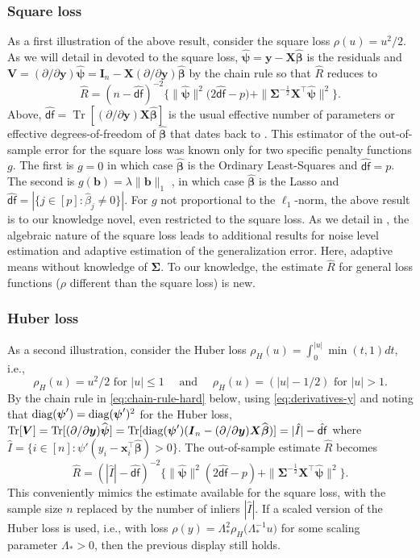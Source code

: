 \documentclass[11pt]{amsart}
\numberwithin{equation}{section}
\numberwithin{equation}{section}
\def\diag{\hbox{\rm diag}}
\DeclareMathOperator{\trace}{Tr}
\def\mathbold{\boldsymbol} %
\def\bb{\mathbold{b}}\def\bhat{\widehat{b}}\def\btil{\widetilde{b}}
\def\bI{\mathbold{I}}\def\hbI{{\widehat{\bI}}}\def\tbI{{\widetilde{\bI}}}
\def\bV{\mathbold{V}}\def\hbV{{\widehat{\bV}}}\def\tbV{{\widetilde{\bV}}}
\def\bx{\mathbold{x}}\def\xhat{\widehat{x}}\def\xtil{\widetilde{x}}\def\xbar{{\overline x}}\def\vbx{{\bf x}}
\def\bX{\mathbold{X}}\def\hbX{{\widehat{\bX}}}\def\tbX{{\widetilde{\bX}}}\def\bXbar{{\overline \bX}}
\def\by{\mathbold{y}}\def\yhat{\widehat{y}}\def\ytil{\widetilde{y}}\def\ybar{{\overline y}}\def\vby{{\bf y}}
\def\bbeta{\mathbold{\beta}}\def\betahat{\widehat{\beta}}\def\hbeta{\widehat{\beta}}
\def\hbbeta{{{\widehat{\bbeta}}}}
\def\bSigma{\mathbold{\Sigma}}\def\hbSigma{{\widehat{\bSigma}}}
\def\bpsi{\mathbold{\psi}}\def\psihat{\widehat{\psi}}\def\hpsi{\widehat{\psi}}
\def\hbpsi{{\widehat{\bpsi}}}\def\tbpsi{{\widetilde{\bpsi}}}
\def\df{{\hat{\mathsf{df}}}{}}
\begin{document}
\subsubsection{Square loss} 
As a first illustration of the above result,
consider the square loss $\rho(u)=u^2/2$. 
As we will detail in 
 devoted to the square loss,
$\hbpsi = \by-\bX\hbbeta$ is the residuals and
$\bV = (\partial/\partial\by)\hbpsi = \bI_n - \bX(\partial/\partial\by)\hbbeta$
by the chain rule so that $\hat R$ reduces to
\begin{equation*}
\hat R =
(n-\df)^{-2} \bigl\{ \|\hbpsi\|^2
    \bigl(2\df -p\bigr)
+ \|\bSigma^{-\frac12}\bX^\top\hbpsi\|^2\bigr\}.
\end{equation*}
Above, $\df=\trace[(\partial/\partial\by)\bX\hbbeta]$
is the usual effective number of parameters or effective
degrees-of-freedom of $\hbbeta$ that
dates back to \citet{stein1981estimation}.
This estimator of the out-of-sample error
for the square loss was known only for two specific penalty functions $g$.
The first is $g=0$ \cite{leeb2008evaluation} in which case $\hbbeta$ is
the Ordinary Least-Squares 
and $\df=p$.
The second is $g(\bb)=\lambda\|\bb\|_1$
\cite{bayati2013estimating,miolane2018distribution},
in which case $\hbbeta$ is the Lasso and $\df=|\{j\in[p]:\hbeta_j\ne 0\}|$.
For $g$ not proportional to the $\ell_1$-norm,
the above result is to our knowledge
novel, even restricted to the square loss.
As we detail in ,
the algebraic nature of the square loss leads to additional results
for noise level estimation and adaptive estimation of the generalization error.
Here, adaptive means without knowledge of $\bSigma$.
To our knowledge, the estimate $\hat R$ for general loss functions
($\rho$ different than the square loss) is new.

\subsubsection{Huber loss}
As a second illustration, consider the Huber loss
$\rho_H(u)=\int_0^{|u|}\min(t,1)dt$, i.e.,
\begin{equation}
    \label{eq:Huber-loss}
\rho_H(u) = u^2/2 \text{ for } |u|\le 1
\quad\text{ and }\quad \rho_H(u) = (|u| - 1/2) \text{ for }|u|>1.
\end{equation}
By the chain rule in \eqref{eq:chain-rule-hard} below,
using \eqref{eq:derivatives-y} and noting that $\diag(\bpsi')=\diag(\bpsi')^2$
for the Huber loss,
$\trace[\bV]=\trace[(\partial/\partial \by)\hbpsi]
= \trace[\diag(\bpsi')(\bI_n - (\partial/\partial\by)\bX\hbbeta)]
=|\hat I| - \df$
where $\hat I = \{i\in[n]: \psi'(y_i-\bx_i^\top\hbbeta)>0\}$.
The out-of-sample estimate $\hat R$ becomes
$$\hat R
= (|\hat I| - \df)^{-2}
\bigl\{
    \|\hbpsi\|^2
    (2\df -p)
    + \|\bSigma^{-\frac12}\bX^\top\hbpsi\|^2
\bigr\}.
$$
This conveniently mimics the estimate available for the square loss, with 
the sample size $n$ replaced by the number of inliers $|\hat I|$.
If a scaled version of the Huber loss is used, i.e.,
with loss $\rho(y)=\Lambda_*^2\rho_H\big(\Lambda_*^{-1}u\big)$
for some scaling parameter $\Lambda_*>0$,
then the previous display still holds. 
\end{document}
